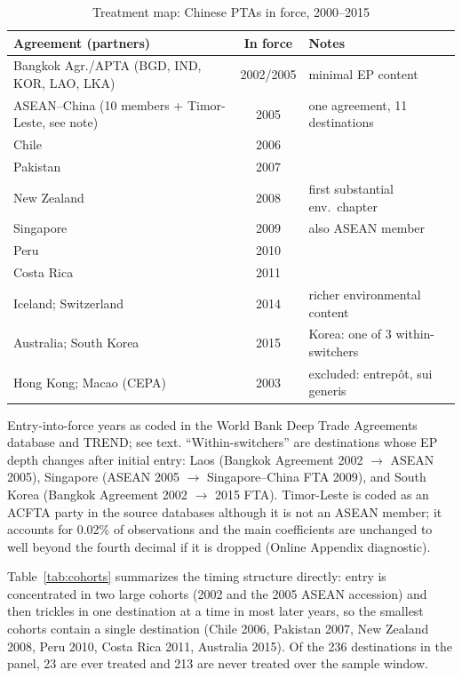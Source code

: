 \documentclass[12pt]{article}
\begin{document}
\begin{table}[htbp]
\centering
\caption{Treatment map: Chinese PTAs in force, 2000--2015}
\label{tab:treatment}
\small
\begin{threeparttable}
\begin{tabular}{lcl}
\toprule
Agreement (partners) & In force & Notes \\
\midrule
Bangkok Agr./APTA (BGD, IND, KOR, LAO, LKA) & 2002/2005 & minimal EP content \\
ASEAN--China (10 members + Timor-Leste, see note) & 2005 & one agreement, 11 destinations \\
Chile & 2006 & \\
Pakistan & 2007 & \\
New Zealand & 2008 & first substantial env.\ chapter \\
Singapore & 2009 & also ASEAN member \\
Peru & 2010 & \\
Costa Rica & 2011 & \\
Iceland; Switzerland & 2014 & richer environmental content \\
Australia; South Korea & 2015 & Korea: one of 3 within-switchers \\
\midrule
Hong Kong; Macao (CEPA) & 2003 & excluded: entrep\^ot, sui generis \\
\bottomrule
\end{tabular}
\begin{tablenotes}\footnotesize
\item Entry-into-force years as coded in the World Bank Deep Trade Agreements database
and TREND; see text. ``Within-switchers'' are destinations whose EP depth changes after
initial entry: Laos (Bangkok Agreement 2002 $\to$ ASEAN 2005), Singapore (ASEAN 2005
$\to$ Singapore--China FTA 2009), and South Korea (Bangkok Agreement 2002 $\to$ 2015
FTA). Timor-Leste is coded as an ACFTA party in the source databases although
it is not an ASEAN member; it accounts for 0.02\% of observations and the main
coefficients are unchanged to well beyond the fourth decimal if it is dropped (Online
Appendix diagnostic).
\end{tablenotes}
\end{threeparttable}
\end{table}

Table~\ref{tab:cohorts} summarizes the timing structure directly: entry is concentrated
in two large cohorts (2002 and the 2005 ASEAN accession) and then trickles in one
destination at a time in most later years, so the smallest cohorts contain a single
destination (Chile 2006, Pakistan 2007, New Zealand 2008, Peru 2010, Costa Rica 2011,
Australia 2015). Of the 236 destinations in the panel, 23 are ever treated and 213 are
never treated over the sample window.
\end{document}
